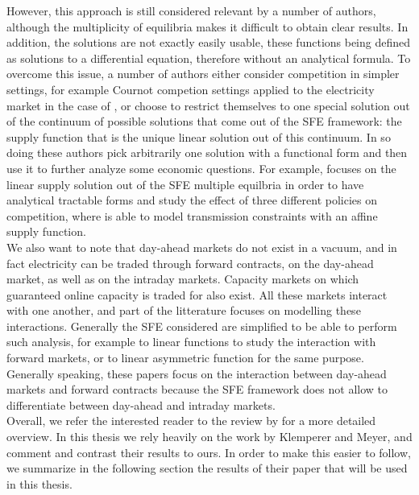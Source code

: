 However, this approach is still considered relevant by a number of authors, although the multiplicity of equilibria makes it difficult to obtain clear results. In addition, the solutions are not exactly easily usable, these functions being defined as solutions to a differential equation, therefore without an analytical formula. To overcome this issue, a number of authors either consider competition in simpler settings, for example Cournot competion settings applied to the electricity market in the case of \cite{borenstein1999empirical}, or choose to restrict themselves to one special solution out of the continuum of possible solutions that come out of the SFE framework: the supply function that is the unique linear solution out of this continuum. In so doing these authors pick arbitrarily one solution with a functional form and then use it to further analyze some economic questions. For example, \cite{green1996increasing} focuses on the linear supply solution out of the SFE multiple equilbria in order to have analytical tractable forms and study the effect of three different policies on competition, where 
\cite{hobbs2000strategic} is able to model transmission constraints with an affine supply function.\\

We also want to note that day-ahead markets do not exist in a vacuum, and in fact electricity can be traded through forward contracts, on the day-ahead market, as well as on the intraday markets. Capacity markets on which guaranteed online capacity is traded for also exist. All these markets interact with one another, and part of the litterature focuses on modelling these interactions. Generally the SFE considered are simplified to be able to perform such analysis, for example to linear functions \cite{green1999electricity} to study the interaction with forward markets, or to linear asymmetric function \cite{anderson2012asymmetric} for the same purpose. Generally speaking, these papers focus on the interaction between day-ahead markets and forward contracts because the SFE framework does not allow to differentiate between day-ahead and intraday markets. \\

Overall, we refer the interested reader to the review by \cite{ventosa2005electricity} for a more detailed overview. In this thesis we rely heavily on the work by Klemperer and Meyer, and comment and contrast their results to ours. In order to make this easier to follow, we summarize in the following section the results of their paper that will be used in this thesis.

